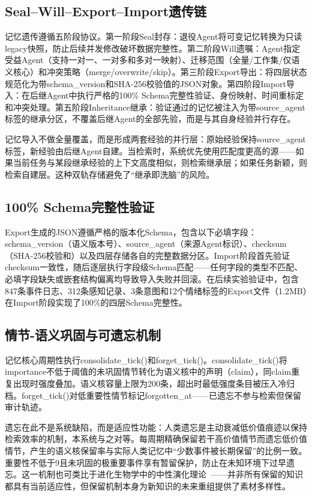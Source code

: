 \documentclass[12pt,a4paper]{ctexart}
\begin{document}
\subsection{Seal--Will--Export--Import遗传链}

记忆遗传遵循五阶段协议。第一阶段Seal封存：退役Agent将可变记忆转换为只读legacy快照，防止后续并发修改破坏数据完整性。第二阶段Will遗嘱：Agent指定受益Agent（支持一对一、一对多和多对一映射）、迁移范围（全量/工作集/仅语义核心）和冲突策略（merge/overwrite/skip）。第三阶段Export导出：将四层状态规范化为带schema\_version和SHA-256校验值的JSON对象。第四阶段Import导入：在后继Agent中执行严格的100\% Schema完整性验证、身份映射、时间重标定和冲突处理。第五阶段Inheritance继承：验证通过的记忆被注入为带source\_agent标签的继承分区，不覆盖后继Agent的全部先验，而是与其自身经验并行存在。

记忆导入不做全量覆盖，而是形成两套经验的并行层：原始经验保持source\_agent标签，新经验由后继Agent自建。当检索时，系统优先使用匹配度更高的源——如果当前任务与某段继承经验的上下文高度相似，则检索继承层；如果任务新颖，则检索自建层。这种双轨存储避免了“继承即洗脑”的风险。

\subsection{100\% Schema完整性验证}

Export生成的JSON遵循严格的版本化Schema，包含以下必填字段：schema\_version（语义版本号）、source\_agent（来源Agent标识）、checksum（SHA-256校验和）以及四层存储各自的完整数据分区。Import阶段首先验证checksum一致性，随后逐层执行字段级Schema匹配——任何字段的类型不匹配、必填字段缺失或嵌套结构偏离均导致导入失败并回滚。在后续实验验证中，包含847条事件日志、312条感知记录、3条意图和12个情绪标签的Export文件（1.2MB）在Import阶段实现了100\%的四层Schema完整性。

\subsection{情节-语义巩固与可遗忘机制}

记忆核心周期性执行consolidate\_tick()和forget\_tick()。consolidate\_tick()将importance不低于阈值的未巩固情节转化为语义核中的声明（claim），同claim重复出现时强度叠加。语义核容量上限为200条，超出时最低强度条目被压入冷归档。forget\_tick()对低重要性情节标记forgotten\_at——已遗忘不参与检索但保留审计轨迹。

遗忘在此不是系统缺陷，而是适应性功能：人类遗忘是主动衰减低价值痕迹以保持检索效率的机制，本系统与之对等。每周期精确保留若干高价值情节而遗忘低价值情节，产生的语义核保留率与实际人类记忆中“少数事件被长期保留”的比例一致。重要性不低于9且未巩固的极重要事件享有暂留保护，防止在未知环境下过早遗忘。这一机制也可类比于进化生物学中的中性演化理论~\cite{stoltzfus1999constructive}——并非所有保留的知识都具有当前适应性，但保留机制本身为新知识的未来重组提供了素材多样性。
\end{document}
